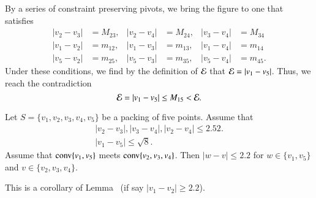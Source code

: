 \begin{tarskidata}
\begin{tarski}
\begin{proved}
By a series of constraint preserving pivots, we bring the figure to one that satisfies
	$$
	\begin{array}{rlrlrl}
	|v_2-v_3|&=M_{23}, &|v_2-v_4| &= M_{24}, &|v_3-v_4| &= M_{34}\\
	|v_1-v_2|&=m_{12}, &|v_1-v_3| &= m_{13}, &|v_1-v_4| &= m_{14}\\
	|v_5-v_2|&=m_{25}, &|v_5-v_3| &= m_{35}, &|v_5-v_4| &= m_{45}.
	\end{array}
	$$
Under these conditions, we find by the definition of ${\mathcal E}$ 
that ${\mathcal E} = |v_1-v_5|$.  Thus, we reach the contradiction
	$$
	{\mathcal E} = |v_1-v_5| \le M_{15} < {\mathcal E}.
	$$
\swallowed\end{proved}
\end{tarski}





\begin{tarski}

\begin{lemma} 
Let $S=\{v_1,v_2,v_3,v_4,v_5\}$ be a packing of five points.
Assume that
	$$
	\begin{array}{lll}
	|v_2-v_3|, |v_3-v_4|, |v_2-v_4|\le 2.52.\\
	|v_1-v_5|\le \sqrt8.
	\end{array}
	$$
Assume that ${\operatorname{conv}}\{v_1,v_5\}$ meets ${\operatorname{conv}}\{v_2,v_3,v_4\}$.
Then $|w-v|\le 2.2$ for $w\in\{v_1,v_5\}$ and $v\in\{v_2,v_3,v_4\}$.
\end{lemma}

\begin{proved}
This is a corollary of Lemma~ (if say $|v_1-v_2|\ge2.2$).
\swallowed\end{proved}
\end{tarski}





\begin{tarski}


\end{tarski}
\end{tarskidata}
